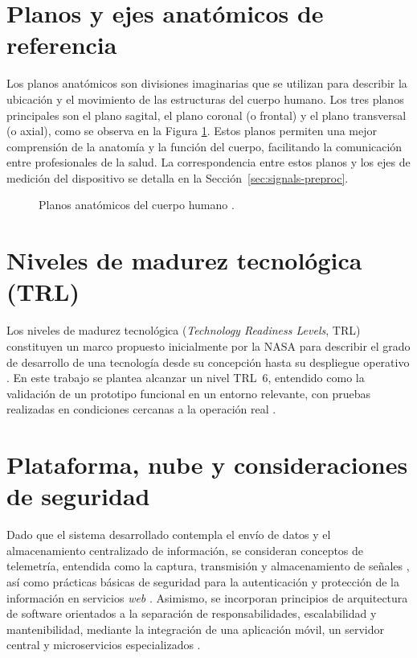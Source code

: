 \documentclass[12pt]{report}
\begin{document}
\begin{justify}
    \section{Planos y ejes anatómicos de referencia}
    \label{sec:planos-anatomicos}
    Los planos anatómicos son divisiones imaginarias que se utilizan para describir
    la ubicación y el movimiento de las estructuras del cuerpo humano. Los tres planos
    principales son el plano sagital, el plano coronal (o frontal) y el plano
    transversal (o axial), como se observa en la Figura \ref{fig:anatomical-planes}.
    Estos planos permiten una mejor comprensión de la anatomía y la función del
    cuerpo, facilitando la comunicación entre profesionales de la salud. La
    correspondencia entre estos planos y los ejes de medición del dispositivo se
    detalla en la Sección~\ref{sec:signals-preproc}.\\
    \begin{figure}[h!]
        \centering
        
        \caption{Planos anatómicos del cuerpo humano \cite{edoaradoAnatomicalPlanes}.}
        \label{fig:anatomical-planes}
    \end{figure}

    \section{Niveles de madurez tecnológica (TRL)}

    Los niveles de madurez tecnológica (\textit{Technology Readiness Levels}, TRL) constituyen un marco propuesto inicialmente por la NASA para describir el grado de desarrollo de una tecnología desde su concepción hasta su despliegue operativo \cite{TRL-EuroFunding}. En este trabajo se plantea alcanzar un nivel TRL~6, entendido como la validación de un prototipo funcional en un entorno relevante, con pruebas realizadas en condiciones cercanas a la operación real \cite{TRL-ayming}.

    \section{Plataforma, nube y consideraciones de seguridad}

    Dado que el sistema desarrollado contempla el envío de datos y el almacenamiento centralizado de información, se consideran conceptos de telemetría, entendida como la captura, transmisión y almacenamiento de señales \cite{Telemetría}, así como prácticas básicas de seguridad para la autenticación y protección de la información en servicios \textit{web} \cite{Cyber-security-protocols}. Asimismo, se incorporan principios de arquitectura de software orientados a la separación de responsabilidades, escalabilidad y mantenibilidad, mediante la integración de una aplicación móvil, un servidor central y microservicios especializados \cite{Enterprise_architecture-frameworks,Software-architecture}.




\end{justify}
\end{document}
